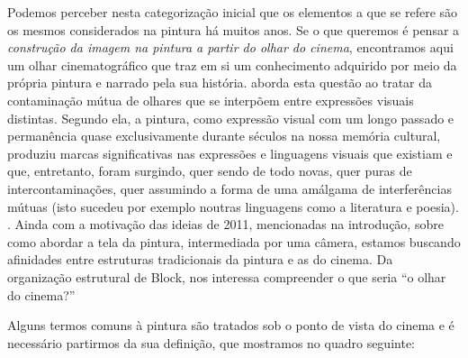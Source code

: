 Podemos perceber nesta categorização inicial que os elementos a que se
refere são os mesmos considerados na pintura há muitos anos. Se o que
queremos é pensar a \emph{construção da imagem na pintura a partir do
	olhar do cinema}, encontramos aqui um olhar cinematográfico que traz em
si um conhecimento adquirido por meio da própria pintura e narrado pela
sua história. \textcite{sabino2000pintura} aborda esta questão ao tratar da
contaminação mútua de olhares que se interpõem entre expressões visuais
distintas. Segundo ela, a pintura, como expressão visual com um longo
passado e permanência quase exclusivamente durante séculos na nossa
memória cultural, produziu marcas significativas nas expressões e
linguagens visuais que existiam e que, entretanto, foram surgindo, quer
sendo de todo novas, quer puras de intercontaminações, quer assumindo a
forma de uma amálgama de interferências mútuas (isto sucedeu por
exemplo noutras linguagens como a literatura e poesia).
.
Ainda com a motivação das ideias de 2011, mencionadas na introdução,
sobre como abordar a tela da pintura, intermediada por uma câmera,
estamos buscando afinidades entre estruturas tradicionais da pintura e
as do cinema. Da organização estrutural de Block, nos interessa
compreender o que seria \enquote{o olhar do cinema?}

Alguns termos comuns à pintura são tratados sob o ponto de vista do
cinema e é necessário partirmos da sua definição, que mostramos no
quadro seguinte:

